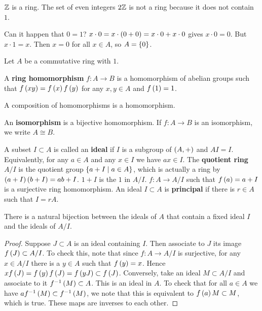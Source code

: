 \begin{example*}
$ \mathbb{Z} $ is a ring. The set of even integers $ 2\mathbb{Z} $ is not a ring because it does not contain $ 1 $.
\end{example*}

\begin{remark}
Can it happen that $ 0 = 1 $? $ x \cdot 0 = x \cdot \left( 0 + 0 \right) = x \cdot 0 + x \cdot 0 $ gives $ x \cdot 0 = 0 $. But $ x \cdot 1 = x $. Then $ x = 0 $ for all $ x \in A $, so $ A = \left\{ 0 \right\} $.
\end{remark}

Let $ A $ be a commutative ring with $ 1 $.

\begin{definition}
A \textbf{ring homomorphism} $ f : A \to B $ is a homomorphism of abelian groups such that $ f\left( xy \right) = f\left( x \right)f\left( y \right) $ for any $ x, y \in A $ and $ f\left( 1 \right) = 1 $.
\end{definition}

\begin{proposition}
A composition of homomorphisms is a homomorphism.
\end{proposition}

An \textbf{isomorphism} is a bijective homomorphism. If $ f : A \to B $ is an isomorphism, we write $ A \cong B $.


\begin{definition}
A subset $ I \subset A $ is called an \textbf{ideal} if $ I $ is a subgroup of $ \left( A, + \right) $ and $ AI = I $. Equivalently, for any $ a \in A $ and any $ x \in I $ we have $ ax \in I $. The \textbf{quotient ring} $ A / I $ is the quotient group $ \left\{ a + I \mid a \in A \right\} $, which is actually a ring by $ \left( a + I \right)\left( b + I \right) = ab + I $. $ 1 + I $ is the $ 1 $ in $ A / I $. $ f : A \to A / I $ such that $ f\left( a \right) = a + I $ is a surjective ring homomorphism. An ideal $ I \subset A $ is \textbf{principal} if there is $ r \in A $ such that $ I = rA $.
\end{definition}

\begin{proposition}
There is a natural bijection between the ideals of $ A $ that contain a fixed ideal $ I $ and the ideals of $ A / I $.
\end{proposition}

\begin{proof}
Suppose $ J \subset A $ is an ideal containing $ I $. Then associate to $ J $ its image $ f\left( J \right) \subset A / I $. To check this, note that since $ f : A \to A / I $ is surjective, for any $ x \in A / I $ there is a $ y \in A $ such that $ f\left( y \right) = x $. Hence $ xf\left( J \right) = f\left( y \right)f\left( J \right) = f\left( yJ \right) \subset f\left( J \right) $. Conversely, take an ideal $ M \subset A / I $ and associate to it $ f^{-1}\left( M \right) \subset A $. This is an ideal in $ A $. To check that for all $ a \in A $ we have $ af^{-1}\left( M \right) \subset f^{-1}\left( M \right) $, we note that this is equivalent to $ f\left( a \right)M \subset M $, which is true. These maps are inverses to each other.
\end{proof}

